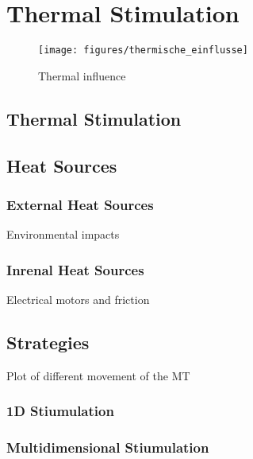 \chapter{Thermal Stimulation}
\label{chp:thermal_stimulation}

\begin{figure}[!htb]
    \centering
    \texttt{[image: figures/thermische\_einflusse]} %
    \caption[2D Example Least Square vs. Gruop LASSO]{Thermal influence}
    \label{fig:thermische Einflusse}
\end{figure}



\section{Thermal Stimulation}
\label{sec:thermal_stimulation}

\section{Heat Sources}
\label{sec:heat_sources}

\subsection{External Heat Sources}
\label{sec:external_heat_sources}

Environmental impacts

\subsection{Inrenal Heat Sources}
\label{sec:internal_heat_sources}

Electrical motors and friction

\section{Strategies}
\label{sec:strategies}

Plot of different movement of the MT


\subsection{1D Stiumulation}
\label{sec:1D_stimulation}

\subsection{Multidimensional Stiumulation}
\label{sec:multideimensional_stimulation}

